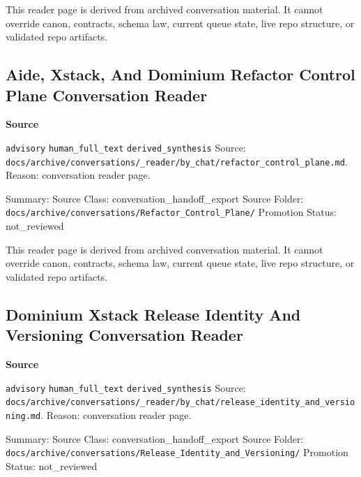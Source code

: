 \documentclass[9pt,a4paper,openany]{book}
\newcommand{\vonecallout}[3]{\par\medskip\noindent\begingroup\setlength{\fboxsep}{7pt}\colorbox{DomCalloutBg}{\parbox{0.94\linewidth}{\textbf{\textcolor{#1}{#2}}\par #3}}\endgroup\par\medskip}
\begin{document}
This reader page is derived from archived conversation material.\allowbreak{} It cannot override canon, contracts, schema law, current queue state, live repo structure, or validated repo artifacts.\allowbreak{}



\subsection{Aide, Xstack, And Dominium Refactor Control Plane Conversation Reader}

\vonecallout{DomSlate}{Source}{\texttt{advisory} \texttt{human\_\allowbreak{}full\_\allowbreak{}text} \texttt{derived\_\allowbreak{}synthesis} Source: \texttt{docs/\allowbreak{}archive/\allowbreak{}conversations/\allowbreak{}\_\allowbreak{}reader/\allowbreak{}by\_\allowbreak{}chat/\allowbreak{}refactor\_\allowbreak{}control\_\allowbreak{}plane.\allowbreak{}md}.\allowbreak{} Reason: conversation reader page.\allowbreak{}}

Summary: Source Class: conversation\_\allowbreak{}handoff\_\allowbreak{}export Source Folder: \texttt{docs/\allowbreak{}archive/\allowbreak{}conversations/\allowbreak{}Refactor\_\allowbreak{}Control\_\allowbreak{}Plane/\allowbreak{}} Promotion Status: not\_\allowbreak{}reviewed


This reader page is derived from archived conversation material.\allowbreak{} It cannot override canon, contracts, schema law, current queue state, live repo structure, or validated repo artifacts.\allowbreak{}



\subsection{Dominium Xstack Release Identity And Versioning Conversation Reader}

\vonecallout{DomSlate}{Source}{\texttt{advisory} \texttt{human\_\allowbreak{}full\_\allowbreak{}text} \texttt{derived\_\allowbreak{}synthesis} Source: \texttt{docs/\allowbreak{}archive/\allowbreak{}conversations/\allowbreak{}\_\allowbreak{}reader/\allowbreak{}by\_\allowbreak{}chat/\allowbreak{}release\_\allowbreak{}identity\_\allowbreak{}and\_\allowbreak{}versioning.\allowbreak{}md}.\allowbreak{} Reason: conversation reader page.\allowbreak{}}

Summary: Source Class: conversation\_\allowbreak{}handoff\_\allowbreak{}export Source Folder: \texttt{docs/\allowbreak{}archive/\allowbreak{}conversations/\allowbreak{}Release\_\allowbreak{}Identity\_\allowbreak{}and\_\allowbreak{}Versioning/\allowbreak{}} Promotion Status: not\_\allowbreak{}reviewed
\end{document}

